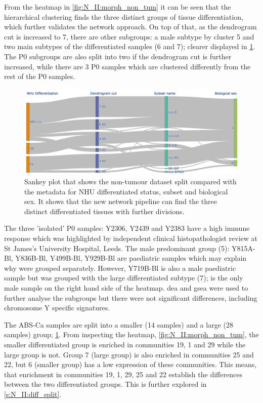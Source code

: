 From the heatmap in \cref{fig:N_II:morph_non_tum} it can be seen that the hierarchical clustering finds the three distinct groups of tissue differentiation, which further validates the network approach. On top of that, as the dendrogram cut is increased to 7, there are other subgroups: a male subtype by cluster 5 and two main subtypes of the differentiated samples (6 and 7); clearer displayed in \cref{fig:N_II:non_tum_sankey_comp}. The P0 subgroups are also split into two if the dendrogram cut is further increased, while there are 3 P0 samples which are clustered differently from the rest of the P0 samples. 

\begin{figure}[!t]    
    \centering
    \includegraphics[width=1.0\textwidth,keepaspectratio]{Sections/Network_II/resources/non_tum/non_tum_split.png}
    \caption[Split of the healthy dataset]{Sankey plot that shows the non-tumour dataset split compared with the metadata for NHU differentiated status, subset and biological sex. It shows that the new network pipeline can find the three distinct differentiated tissues with further divisions.}
    \label{fig:N_II:non_tum_sankey_comp}
\end{figure}

The three 'isolated' P0 samples: Y2306, Y2439 and Y2383 have a high immune response which was highlighted by independent clinical histopathologist review at St James's University Hospital, Leeds. The male predominant group (5): Y815A-Bl, Y836B-Bl, Y499B-Bl, Y929B-Bl are paediatric samples which may explain why were grouped separately. However, Y719B-Bl is also a male paediatric sample but was grouped with the large differentiated subtype (7); is the only male sample on the right hand side of the heatmap. \acrfull{dea} and \acrfull{gsea} were used to further analyse the subgroups but there were not significant differences, including chromosome Y specific signatures.

The ABS-Ca samples are split into a smaller (14 samples) and a large (28 samples) group; \cref{fig:N_II:non_tum_sankey_comp}. From inspecting the heatmap, \cref{fig:N_II:morph_non_tum}, the smaller differentiated group is enriched in communities 19, 1 and 29 while the large group is not. Group 7 (large group) is also enriched in communities 25 and 22,  but 6 (smaller group) has a low expression of these communities. This means, that enrichment in communities 19, 1, 29, 25 and 22 establish the differences between the two differentiated groups. This is further explored in \cref{s:N_II:diff_split}.


